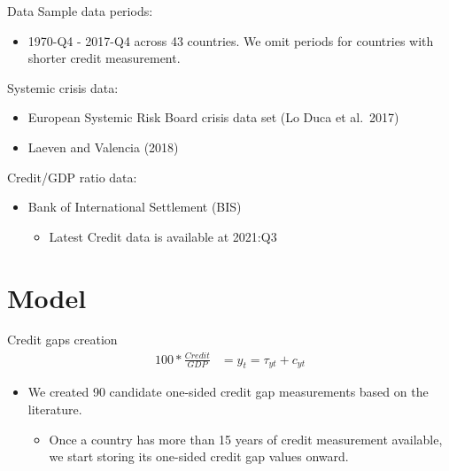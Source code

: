 \documentclass[
  ignorenonframetext,
]{beamer}
\providecommand{\tightlist}{%
  \setlength{\itemsep}{0pt}\setlength{\parskip}{0pt}}
\begin{document}
\begin{frame}{Data}
\protect\hypertarget{data}{}
Sample data periods:

\begin{itemize}
\tightlist
\item
  1970-Q4 - 2017-Q4 across 43 countries. We omit periods for countries
  with shorter credit measurement.
\end{itemize}

Systemic crisis data:

\begin{itemize}
\tightlist
\item
  European Systemic Risk Board crisis data set (Lo Duca et al.~2017)
\item
  Laeven and Valencia (2018)
\end{itemize}

Credit/GDP ratio data:

\begin{itemize}
\tightlist
\item
  Bank of International Settlement (BIS)

  \begin{itemize}
  \tightlist
  \item
    Latest Credit data is available at 2021:Q3
  \end{itemize}
\end{itemize}
\end{frame}

\hypertarget{model}{%
\section{Model}\label{model}}

\begin{frame}{Credit gaps creation}
\protect\hypertarget{credit-gaps-creation}{}
\begin{align}
    100*\frac{Credit}{GDP} &= y_t = \tau_{yt} + c_{yt}
\end{align}

\begin{itemize}
\tightlist
\item
  We created 90 candidate one-sided credit gap measurements based on the
  literature.

  \begin{itemize}
  \tightlist
  \item
    Once a country has more than 15 years of credit measurement
    available, we start storing its one-sided credit gap values onward.
  \end{itemize}
\end{itemize}
\end{frame}
\end{document}
